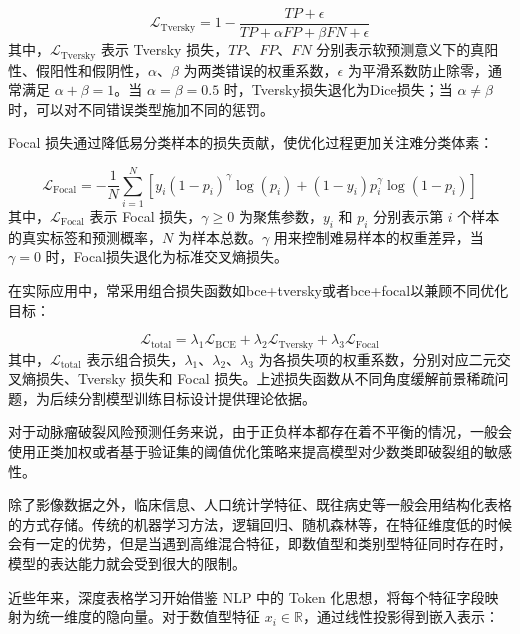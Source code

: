 \begin{equation}
    \mathcal{L}_{\text{Tversky}} = 1 - \frac{TP + \epsilon}{TP + \alpha FP + \beta FN + \epsilon}
    \label{eq:tversky}
\end{equation}
其中，$\mathcal{L}_{\text{Tversky}}$ 表示 Tversky 损失，$TP$、$FP$、$FN$ 分别表示软预测意义下的真阳性、假阳性和假阴性，$\alpha$、$\beta$ 为两类错误的权重系数，$\epsilon$ 为平滑系数防止除零，通常满足 $\alpha+\beta=1$。当 $\alpha=\beta=0.5$ 时，Tversky损失退化为Dice损失；当 $\alpha \neq \beta$ 时，可以对不同错误类型施加不同的惩罚。

Focal 损失通过降低易分类样本的损失贡献，使优化过程更加关注难分类体素：

\begin{equation}
    \mathcal{L}_{\text{Focal}} = -\frac{1}{N}\sum_{i=1}^{N} \left[ y_i (1-p_i)^\gamma \log(p_i) + (1-y_i) p_i^\gamma \log(1-p_i) \right]
    \label{eq:focal}
\end{equation}
其中，$\mathcal{L}_{\text{Focal}}$ 表示 Focal 损失，$\gamma \geq 0$ 为聚焦参数，$y_i$ 和 $p_i$ 分别表示第 $i$ 个样本的真实标签和预测概率，$N$ 为样本总数。$\gamma$ 用来控制难易样本的权重差异，当 $\gamma=0$ 时，Focal损失退化为标准交叉熵损失。

在实际应用中，常采用组合损失函数如bce+tversky或者bce+focal以兼顾不同优化目标：

\begin{equation}
    \mathcal{L}_{\text{total}} = \lambda_1 \mathcal{L}_{\text{BCE}} + \lambda_2 \mathcal{L}_{\text{Tversky}} + \lambda_3 \mathcal{L}_{\text{Focal}}
    \label{eq:total-loss}
\end{equation}
其中，$\mathcal{L}_{\text{total}}$ 表示组合损失，$\lambda_1$、$\lambda_2$、$\lambda_3$ 为各损失项的权重系数，分别对应二元交叉熵损失、Tversky 损失和 Focal 损失。上述损失函数从不同角度缓解前景稀疏问题，为后续分割模型训练目标设计提供理论依据。

对于动脉瘤破裂风险预测任务来说，由于正负样本都存在着不平衡的情况，一般会使用正类加权或者基于验证集的阈值优化策略来提高模型对少数类即破裂组的敏感性。


除了影像数据之外，临床信息、人口统计学特征、既往病史等一般会用结构化表格的方式存储。传统的机器学习方法，逻辑回归、随机森林等，在特征维度低的时候会有一定的优势，但是当遇到高维混合特征，即数值型和类别型特征同时存在时，模型的表达能力就会受到很大的限制。

近些年来，深度表格学习开始借鉴 NLP 中的 Token 化思想，将每个特征字段映射为统一维度的隐向量。对于数值型特征 $x_i \in \mathbb{R}$，通过线性投影得到嵌入表示：

